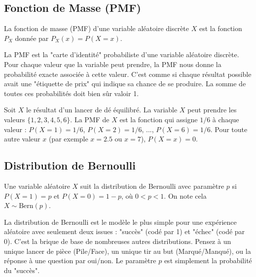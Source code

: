 \subsection{Fonction de Masse (PMF)}

\begin{definitionbox}
La fonction de masse (PMF) d'une variable aléatoire discrète $X$ est la fonction $P_X$ donnée par $P_X(x) = P(X=x)$.
\end{definitionbox}

\begin{intuitionbox}
La PMF est la "carte d'identité" probabiliste d'une variable aléatoire discrète. Pour chaque valeur que la variable peut prendre, la PMF nous donne la probabilité exacte associée à cette valeur. C'est comme si chaque résultat possible avait une "étiquette de prix" qui indique sa chance de se produire. La somme de toutes ces probabilités doit bien sûr valoir 1.
\end{intuitionbox}

\begin{examplebox}
Soit $X$ le résultat d'un lancer de dé équilibré. La variable $X$ peut prendre les valeurs $\{1, 2, 3, 4, 5, 6\}$.
La PMF de $X$ est la fonction qui assigne $1/6$ à chaque valeur :
$P(X=1) = 1/6$, $P(X=2) = 1/6$, ..., $P(X=6) = 1/6$.
Pour toute autre valeur $x$ (par exemple $x=2.5$ ou $x=7$), $P(X=x) = 0$.
\end{examplebox}

\subsection{Distribution de Bernoulli}

\begin{definitionbox}
Une variable aléatoire $X$ suit la distribution de Bernoulli avec paramètre $p$ si $P(X=1) = p$ et $P(X=0) = 1-p$, où $0 < p < 1$. On note cela $X \sim \text{Bern}(p)$.
\end{definitionbox}

\begin{intuitionbox}
La distribution de Bernoulli est le modèle le plus simple pour une expérience aléatoire avec seulement deux issues : "succès" (codé par 1) et "échec" (codé par 0). C'est la brique de base de nombreuses autres distributions. Pensez à un unique lancer de pièce (Pile/Face), un unique tir au but (Marqué/Manqué), ou la réponse à une question par oui/non. Le paramètre $p$ est simplement la probabilité du "succès".
\end{intuitionbox}

